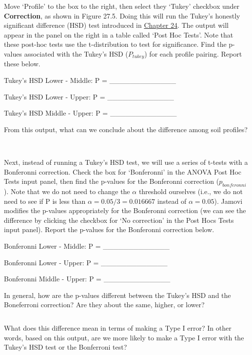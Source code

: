 \documentclass[
]{scrbook}
\begin{document}
Move `Profile' to the box to the right, then select they `Tukey' checkbox under \textbf{Correction}, as shown in Figure 27.5.
Doing this will run the Tukey's honestly significant difference (HSD) test introduced in \protect\hyperlink{Chapter_24}{Chapter 24}.
The output will appear in the panel on the right in a table called `Post Hoc Tests'.
Note that these post-hoc tests use the t-distribution to test for significance.
Find the p-values associated with the Tukey's HSD (\(P_{tukey}\)) for each profile pairing.
Report these below.

Tukey's HSD Lower - Middle: P = \_\_\_\_\_\_\_\_\_\_\_\_\_

Tukey's HSD Lower - Upper: P = \_\_\_\_\_\_\_\_\_\_\_\_\_

Tukey's HSD Middle - Upper: P = \_\_\_\_\_\_\_\_\_\_\_\_\_

From this output, what can we conclude about the difference among soil profiles?

\begin{verbatim}


\end{verbatim}

Next, instead of running a Tukey's HSD test, we will use a series of t-tests with a Bonferonni correction.
Check the box for `Bonferonni' in the ANOVA Post Hoc Tests input panel, then find the p-values for the Bonferonni correction (\(p_{bonferonni}\)).
Note that we do not need to change the \(\alpha\) threshold ourselves (i.e., we do not need to see if P is less than \(\alpha = 0.05/3 = 0.016667\) instead of \(\alpha = 0.05\)).
Jamovi modifies the p-values appropriately for the Bonferonni correction (we can see the difference by clicking the checkbox for `No correction' in the Post Hocs Tests input panel).
Report the p-values for the Bonferonni correction below.

Bonferonni Lower - Middle: P = \_\_\_\_\_\_\_\_\_\_\_\_\_

Bonferonni Lower - Upper: P = \_\_\_\_\_\_\_\_\_\_\_\_\_

Bonferonni Middle - Upper: P = \_\_\_\_\_\_\_\_\_\_\_\_\_

In general, how are the p-values different between the Tukey's HSD and the Boneferroni correction?
Are they about the same, higher, or lower?

\begin{verbatim}
\end{verbatim}

What does this difference mean in terms of making a Type I error?
In other words, based on this output, are we more likely to make a Type I error with the Tukey's HSD test or the Bonferroni test?
\end{document}
